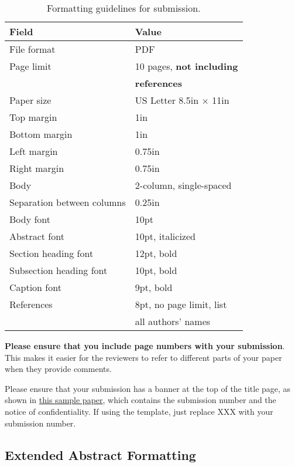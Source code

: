 \documentclass[pageno]{jpaper}
\begin{document}
\begin{table}[h!]
  \centering
  \begin{tabular}{|l|l|}
    \hline
    \textbf{Field} & \textbf{Value}\\
    \hline
    \hline
    File format & PDF \\
    \hline
    Page limit & 10 pages, {\bf not including}\\
               & {\bf references}\\
    \hline
    Paper size & US Letter 8.5in $\times$ 11in\\
    \hline
    Top margin & 1in\\
    \hline
    Bottom margin & 1in\\
    \hline
    Left margin & 0.75in\\
    \hline
    Right margin & 0.75in\\
    \hline
    Body & 2-column, single-spaced\\
    \hline
    Separation between columns & 0.25in\\
    \hline
    Body font & 10pt\\
    \hline
    Abstract font & 10pt, italicized\\
    \hline
    Section heading font & 12pt, bold\\
    \hline
    Subsection heading font & 10pt, bold\\
    \hline
    Caption font & 9pt, bold\\
    \hline
    References & 8pt, no page limit, list \\
               & all authors' names\\
    \hline
  \end{tabular}
  \caption{Formatting guidelines for submission. }
  \label{table:formatting}
\end{table}

\textbf{Please ensure that you include page numbers with your
submission}. This makes it easier for the reviewers to refer to different
parts of your paper when they provide comments.

Please ensure that your submission has a banner at the top of the title
page, as shown in
\href{https://asplos-conference.org/wp-content/uploads/2020/06/asplos21-paper-template.pdf}{this
sample paper}, which contains the submission number and the notice of
confidentiality.  If using the template, just replace XXX with your
submission number.

\subsection{Extended Abstract Formatting}
\end{document}
